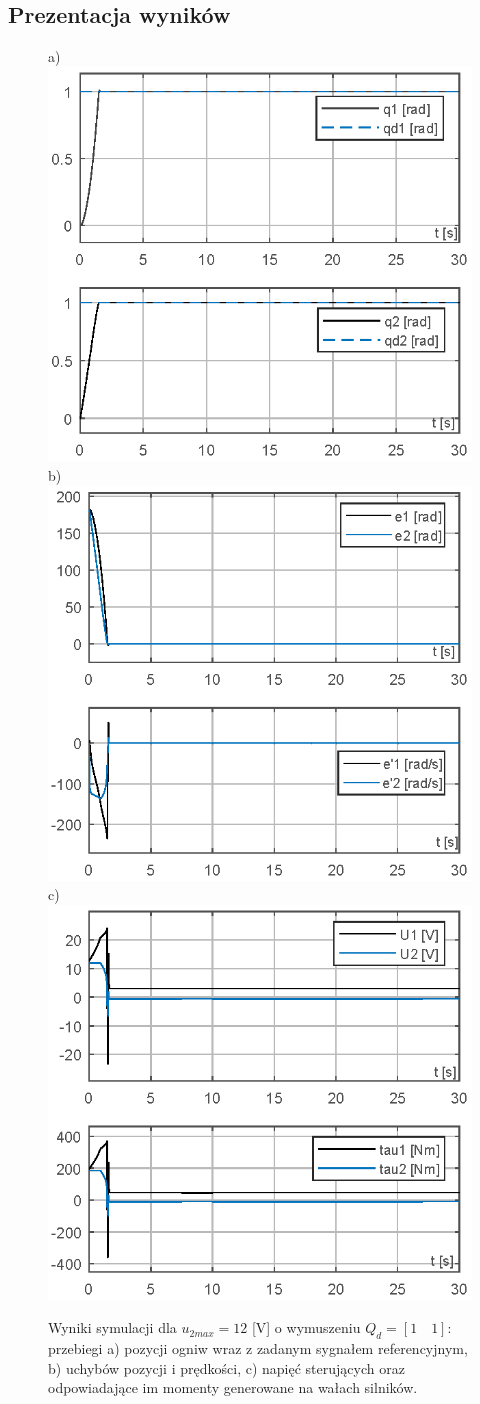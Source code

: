 \documentclass[10pt, a4paper, polish]{article}
\begin{document}
	\subsection{Prezentacja wyników}
	\begin{figure}[h]\centering
		a) \includegraphics[width=0.30\columnwidth]{SRManCw4/SRManL4_ZADANIE2/figs/01Pozycje_U12} b)\includegraphics[width=0.30\columnwidth]{SRManCw4/SRManL4_ZADANIE2/figs/01Uchyby_U12} c)\includegraphics[width=0.30\columnwidth]{SRManCw4/SRManL4_ZADANIE2/figs/01Sygnaly_U12}\caption{
			Wyniki symulacji dla $u_{2max}=12$ [V] o wymuszeniu $Q_d=[1\quad1]$: przebiegi a) pozycji ogniw wraz z zadanym sygnałem referencyjnym, b) uchybów pozycji i prędkości, c)  napięć sterujących oraz odpowiadające im momenty generowane na wałach silników.}\label{fig:hiperprostopadloscian12v}
	\end{figure}
\end{document}
